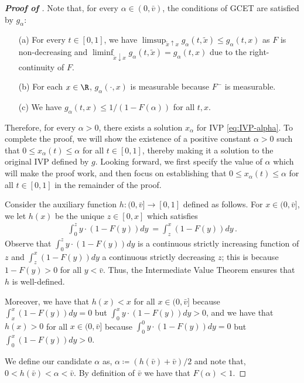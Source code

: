 \begin{proof}[\textbf{Proof of }]
	Note that, for every $\alpha \in (0,\bar v)$, the conditions of GCET are satisfied by $g_\alpha$:
	\begin{itemize}
		\item[(a)] For every $t \in [0,1]$, we have $ \limsup_{\tilde x \uparrow x} g_\alpha(t,\tilde x) \leq g_\alpha(t,x)$ as $F$ is non-decreasing and $ \liminf_{\tilde x \downarrow x} g_\alpha(t,\tilde x) = g_\alpha(t,x)$ due to the right-continuity of $F$.
		\item[(b)] For each $x \in \R$, $g_\alpha(\cdot,x)$ is measurable because $F^-$ is measurable.
		\item[(c)] We have $g_\alpha(t,x) \leq 1/(1 - F(\alpha))$ for all $t,x$.
	\end{itemize}
	
	Therefore, for every $\alpha > 0$, there exists a solution $x_\alpha$ for IVP \eqref{eq:IVP-alpha}. To complete the proof, we will show the existence of a positive constant $\alpha > 0$ such that $0 \leq x_{\alpha}(t) \leq \alpha$ for all $t \in [0,1]$, thereby making it a solution to the original IVP defined by $g$. Looking forward, we first specify the value of $\alpha$ which will make the proof work, and then focus on establishing that $0 \leq x_{\alpha}(t) \leq \alpha$ for all $t \in [0,1]$ in the remainder of the proof. 
	
Consider the auxiliary function $h:(0,\bar v] \to [0,1]$ defined as follows. For $x \in (0,\bar v]$, we let $h(x)$ be the unique $z \in [0,x]$ which satisfies 
	\begin{align*}
		\int_{0}^{z} y \cdot (1 - F(y))dy\ = \int_{z}^{x}  (1 - F(y))dy \,.
	\end{align*}
	Observe that $\int_{0}^{z} y \cdot (1 - F(y))dy$ is a continuous strictly increasing function of $z$ and $\int_{z}^{x}  (1 - F(y))dy$ a continuous strictly decreasing $z$; this is because $1 - F(y) > 0$ for all $y <\bar v$. Thus, the Intermediate Value Theorem ensures that $h$ is well-defined. 
    
    Moreover, we have that $h(x) < x$ for all $x \in (0,\bar v]$ because $\int_{x}^{x}  (1 - F(y))dy = 0$ but $\int_{0}^{x} y \cdot (1 - F(y))dy > 0$, and we have that $h(x) > 0$ for all $x \in (0,\bar v]$ because $\int_{0}^{0} y \cdot (1 - F(y))dy = 0$ but $\int_{0}^{x}  (1 - F(y))dy > 0$.
    
    We define our candidate $\alpha$ as, $\alpha \coloneqq (h(\bar v) + \bar v)/2$ and note that, $0 < h(\bar v) < \alpha < \bar v$. By definition of $\bar v$ we have that $F(\alpha) < 1$.
	

\end{proof}
